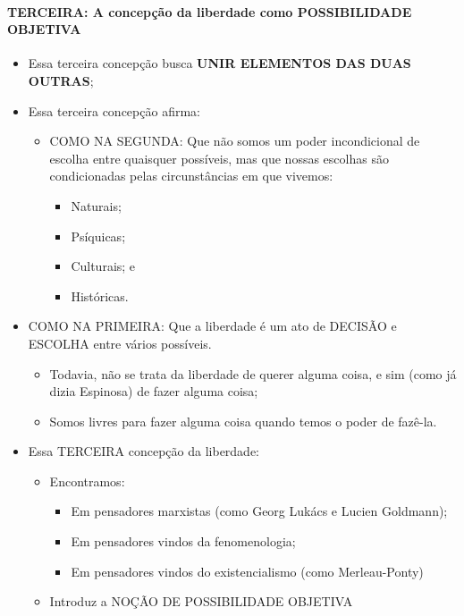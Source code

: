 \documentclass[
]{book}
\providecommand{\tightlist}{%
  \setlength{\itemsep}{0pt}\setlength{\parskip}{0pt}}
\begin{document}
\hypertarget{terceira-a-concepuxe7uxe3o-da-liberdade-como-possibilidade-objetiva}{%
\paragraph{TERCEIRA: A concepção da liberdade como POSSIBILIDADE
OBJETIVA}\label{terceira-a-concepuxe7uxe3o-da-liberdade-como-possibilidade-objetiva}}

\begin{itemize}
\tightlist
\item
  Essa terceira concepção busca \textbf{UNIR ELEMENTOS DAS DUAS OUTRAS};
\item
  Essa terceira concepção afirma:

  \begin{itemize}
  \tightlist
  \item
    COMO NA SEGUNDA: Que não somos um poder incondicional de escolha
    entre quaisquer possíveis, mas que nossas escolhas são condicionadas
    pelas circunstâncias em que vivemos:

    \begin{itemize}
    \tightlist
    \item
      Naturais;
    \item
      Psíquicas;
    \item
      Culturais; e
    \item
      Históricas.
    \end{itemize}
  \end{itemize}
\item
  COMO NA PRIMEIRA: Que a liberdade é um ato de DECISÃO e ESCOLHA entre
  vários possíveis.

  \begin{itemize}
  \tightlist
  \item
    Todavia, não se trata da liberdade de querer alguma coisa, e sim
    (como já dizia Espinosa) de fazer alguma coisa;
  \item
    Somos livres para fazer alguma coisa quando temos o poder de
    fazê-la.
  \end{itemize}
\item
  Essa TERCEIRA concepção da liberdade:

  \begin{itemize}
  \tightlist
  \item
    Encontramos:

    \begin{itemize}
    \tightlist
    \item
      Em pensadores marxistas (como Georg Lukács e Lucien Goldmann);
    \item
      Em pensadores vindos da fenomenologia;
    \item
      Em pensadores vindos do existencialismo (como Merleau-Ponty)
    \end{itemize}
  \item
    Introduz a NOÇÃO DE POSSIBILIDADE OBJETIVA


\end{itemize}
\end{itemize}
\end{document}
